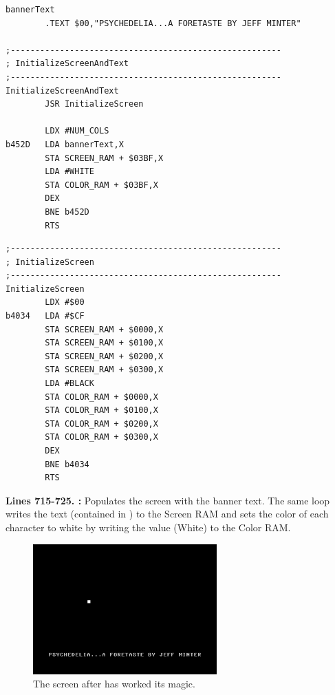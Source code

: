 \clearpage
\begin{lstlisting}[caption = A routine that fills the screen with black and the title text.]
bannerText   
        .TEXT $00,"PSYCHEDELIA...A FORETASTE BY JEFF MINTER"

;-------------------------------------------------------
; InitializeScreenAndText
;-------------------------------------------------------
InitializeScreenAndText   
        JSR InitializeScreen

        LDX #NUM_COLS
b452D   LDA bannerText,X
        STA SCREEN_RAM + $03BF,X
        LDA #WHITE
        STA COLOR_RAM + $03BF,X
        DEX 
        BNE b452D
        RTS 
\end{lstlisting}

\bigskip
\bigskip
\bigskip
\bigskip
\bigskip
\bigskip
\bigskip
\bigskip
\bigskip
\begin{lstlisting}[caption = Fills the screen with black]
;-------------------------------------------------------
; InitializeScreen
;-------------------------------------------------------
InitializeScreen   
        LDX #$00
b4034   LDA #$CF
        STA SCREEN_RAM + $0000,X
        STA SCREEN_RAM + $0100,X
        STA SCREEN_RAM + $0200,X
        STA SCREEN_RAM + $0300,X
        LDA #BLACK
        STA COLOR_RAM + $0000,X
        STA COLOR_RAM + $0100,X
        STA COLOR_RAM + $0200,X
        STA COLOR_RAM + $0300,X
        DEX 
        BNE b4034
        RTS 

\end{lstlisting}
\clearpage

\textbf{Lines 715-725. :} Populates the screen with the banner text. The same loop writes
the text (contained in ) to the Screen RAM and sets the color of each character to white by writing the
value  (White) to the Color RAM.

\begin{figure}[H]
    \centering
      \includegraphics[height=5cm]{src/listing_commentary/foretaste.png}
  \caption*{The screen after  has worked its magic.}
\end{figure}

